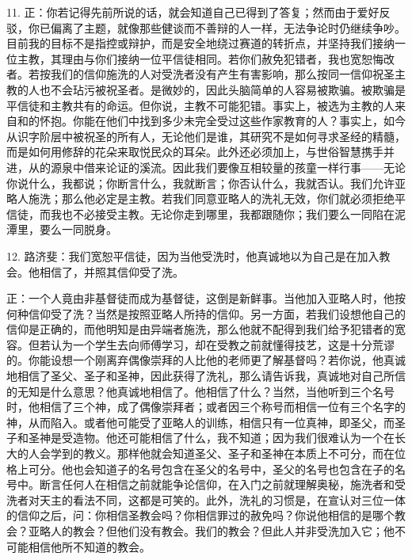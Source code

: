 11. 正：你若记得先前所说的话，就会知道自己已得到了答复；然而由于爱好反驳，你已偏离了主题，就像那些健谈而不善辩的人一样，无法争论时仍继续争吵。目前我的目标不是指控或辩护，而是安全地绕过赛道的转折点，并坚持我们接纳一位主教，其理由与你们接纳一位平信徒相同。若你们赦免犯错者，我也宽恕悔改者。若按我们的信仰施洗的人对受洗者没有产生有害影响，那么按同一信仰祝圣主教的人也不会玷污被祝圣者。是微妙的，因此头脑简单的人容易被欺骗。被欺骗是平信徒和主教共有的命运。但你说，主教不可能犯错。事实上，被选为主教的人来自和的怀抱。你能在他们中找到多少未完全受过这些作家教育的人？事实上，如今从识字阶层中被祝圣的所有人，无论他们是谁，其研究不是如何寻求圣经的精髓，而是如何用修辞的花朵来取悦民众的耳朵。此外还必须加上，与世俗智慧携手并进，从的源泉中借来论证的溪流。因此我们要像互相较量的孩童一样行事——无论你说什么，我都说；你断言什么，我就断言；你否认什么，我就否认。我们允许亚略人施洗；那么他必定是主教。若我们同意亚略人的洗礼无效，你们就必须拒绝平信徒，而我也不必接受主教。无论你走到哪里，我都跟随你；我们要么一同陷在泥潭里，要么一同脱身。\par

12. 路济斐：我们宽恕平信徒，因为当他受洗时，他真诚地以为自己是在加入教会。他相信了，并照其信仰受了洗。\par

正：一个人竟由非基督徒而成为基督徒，这倒是新鲜事。当他加入亚略人时，他按何种信仰受了洗？当然是按照亚略人所持的信仰。另一方面，若我们设想他自己的信仰是正确的，而他明知是由异端者施洗，那么他就不配得到我们给予犯错者的宽容。但若认为一个学生去向师傅学习，却在受教之前就懂得技艺，这是十分荒谬的。你能设想一个刚离弃偶像崇拜的人比他的老师更了解基督吗？若你说，他真诚地相信了圣父、圣子和圣神，因此获得了洗礼，那么请告诉我，真诚地对自己所信的无知是什么意思？他真诚地相信了。他相信了什么？当然，当他听到三个名号时，他相信了三个神，成了偶像崇拜者；或者因三个称号而相信一位有三个名字的神，从而陷入。或者他可能受了亚略人的训练，相信只有一位真神，即圣父，而圣子和圣神是受造物。他还可能相信了什么，我不知道；因为我们很难认为一个在长大的人会学到的教义。那样他就会知道圣父、圣子和圣神在本质上不可分，而在位格上可分。他也会知道子的名号包含在圣父的名号中，圣父的名号也包含在子的名号中。断言任何人在相信之前就能争论信仰，在入门之前就理解奥秘，施洗者和受洗者对天主的看法不同，这都是可笑的。此外，洗礼的习惯是，在宣认对三位一体的信仰之后，问：你相信圣教会吗？你相信罪过的赦免吗？你说他相信的是哪个教会？亚略人的教会？但他们没有教会。我们的教会？但此人并非受洗加入它；他不可能相信他所不知道的教会。\par

